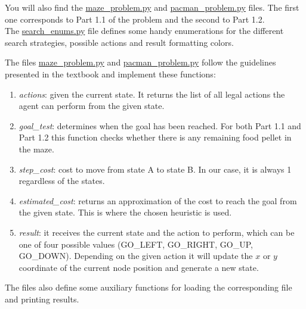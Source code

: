 \documentclass[11pt]{article}
\begin{document}
You will also find the \href{https://github.com/nbermudezs/UIUC_CS440/tree/master/assignment1/part1/maze\_problem.py}{maze\_problem.py} and \href{https://github.com/nbermudezs/UIUC_CS440/tree/master/assignment1/part1/pacman\_problem.py}{pacman\_problem.py} files. The first one corresponds to Part 1.1 of the problem and the second to Part 1.2.\\

The \href{https://github.com/nbermudezs/UIUC_CS440/tree/master/assignment1/part1/search\_enums.py}{search\_enums.py} file defines some handy enumerations for the different search strategies, possible actions and result formatting colors.

The files \href{https://github.com/nbermudezs/UIUC_CS440/tree/master/assignment1/part1/maze\_problem.py}{maze\_problem.py} and \href{https://github.com/nbermudezs/UIUC_CS440/tree/master/assignment1/part1/pacman\_problem.py}{pacman\_problem.py} follow the guidelines presented in the textbook and implement these functions:

\begin{enumerate}
\item \textit{actions}: given the current state. It returns the list of all legal actions the agent can perform from the given state.

\item \textit{goal\_test}: determines when the goal has been reached. For both Part 1.1 and Part 1.2 this function checks whether there is any remaining food pellet in the maze.

\item \textit{step\_cost}: cost to move from state A to state B. In our case, it is always 1 regardless of the states.

\item \textit{estimated\_cost}: returns an approximation of the cost to reach the goal from the given state. This is where the chosen heuristic is used.

\item \textit{result}: it receives the current state and the action to perform, which can be one of four possible values (GO\_LEFT, GO\_RIGHT, GO\_UP, GO\_DOWN). Depending on the given action it will update the $x$ or $y$ coordinate of the current node position and generate a new state. 
\end{enumerate}

The files also define some auxiliary functions for loading the corresponding file and printing results.\\
\end{document}
